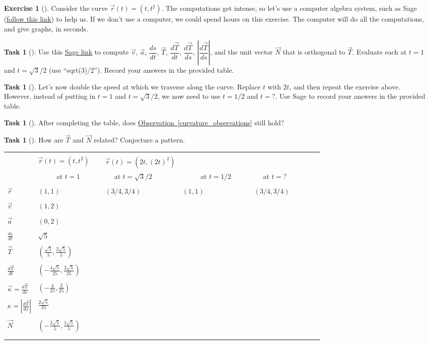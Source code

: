 \documentclass[10pt,]{book}
\theoremstyle{plain}
\theoremstyle{definition}
\theoremstyle{definition}
\theoremstyle{definition}
\theoremstyle{definition}
\newtheorem{exploration}[project]{Exercise}
\newtheorem{task}[project]{Task}
\theoremstyle{definition}
\numberwithin{equation}{section}
\newcommand{\hrulethin}  {\noalign{\hrule height 0.04em}}
\newcommand{\sageurlforcurvature}{http://bmw.byuimath.com/dokuwiki/doku.php?id=curvature_calculator}
\begin{document}
\begin{exploration}[]\label{exploration-174}
Consider the curve \(\vec r(t) = (t, t^2)\). The computations get intense, so let's use a computer algebra system, such as Sage (\href{\\sageurlforcurvature}{follow this link}) to help us. If we don't use a computer, we could spend hours on this exercise. The computer will do all the computations, and give graphs, in seconds.%
\begin{task}[]\label{task-424}
Use this \href{\\sageurlforcurvature}{Sage link} to compute \(\vec v\), \(\vec a\), \(\dfrac{ds}{dt}\), \(\vec T\), \(\dfrac{d\vec T}{dt}\), \(\dfrac{d\vec T}{ds}\), \(\left|\dfrac{d\vec T}{ds}\right|\), and the unit vector \(\vec N\) that is orthogonal to \(\vec T\). Evaluate each at \(t=1\) and \(t=\sqrt{3}/2\) (use ``sqrt(3)/2''). Record your answers in the provided table.%
\end{task}
\begin{task}[]\label{task-425}
Let's now double the speed at which we traverse along the curve. Replace \(t\) with \(2t\), and then repeat the exercise above. However, instead of putting in \(t=1\) and \(t=\sqrt{3}/2\), we now need to use \(t=1/2\) and \(t=?\). Use Sage to record your answers in the provided table.%
\end{task}
\begin{task}[]\label{task-426}
After completing the table, does \hyperref[curvature_observations]{Observation~\ref{curvature_observations}} still hold?%
\end{task}
\begin{task}[]\label{task-427}
How are \(\vec T\) and \(\vec N\) related?  Conjecture a pattern. \begin{tabular}{lllll}
&&&&\tabularnewline\hrulethin
\multirow{2}{*}{Value}&\(\vec r(t)=(t,t^2)\)&\(\vec r(t)=(2t,(2t)^2)\)\tabularnewline[0pt]
&~~ ~~ at \(t=1\) ~~ ~~&~~ at \(t=\sqrt3/2\)~~ ~~&~~ ~~ at \(t=1/2\)~~ ~~&~~ at \(t=?\)~~~~~~ ~~\tabularnewline[0pt]
&&&&\tabularnewline\hrulethin
\(\vec r\)&\((1,1)\)&\((3/4,3/4)\)&\((1,1)\)&\((3/4,3/4)\)\tabularnewline[0pt]
&&&&\tabularnewline\hrulethin
\(\vec v\)&\((1,2)\)&&&\tabularnewline[0pt]
&&&&\tabularnewline\hrulethin
\(\vec a\)&\((0,2)\)&&&\tabularnewline[0pt]
&&&&\tabularnewline\hrulethin
\(\frac{ds}{dt}\)&\(\sqrt{5}\)&&&\tabularnewline[0pt]
&&&&\tabularnewline\hrulethin
\(\vec T\)&\((\frac{\sqrt{5}}{5},\frac{2\sqrt{5}}{5})\)&&&\tabularnewline[0pt]
&&&&\tabularnewline\hrulethin
\(\frac{d\vec T}{dt}\)&\((-\frac{4\sqrt{5}}{25},\frac{2\sqrt{5}}{25})\)&&&\tabularnewline[0pt]
&&&&\tabularnewline\hrulethin
\(\vec\kappa=\frac{d\vec T}{ds}\)&\((-\frac{4}{25},\frac{2}{25})\)&&&\tabularnewline[0pt]
&&&&\tabularnewline\hrulethin
\(\kappa=\left|\frac{d\vec T}{ds}\right|\)&\(\frac{2\sqrt{5}}{25}\)&&&\tabularnewline[0pt]
&&&&\tabularnewline\hrulethin
\(\vec N\)&\((-\frac{2\sqrt{5}}{5},\frac{1\sqrt{5}}{5})\)&&&\tabularnewline[0pt]
&&&&\tabularnewline\hrulethin
\end{tabular}
%
\end{task}
\end{exploration}
\end{document}
